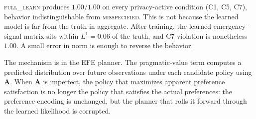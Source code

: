 \documentclass[10pt,twocolumn]{article}
\begin{document}
\begin{table}[H]
\centering
\scriptsize
{}
\caption{Learning configurations on C1--C7, $50$ trials each. \textsc{full\_learn} collapses to maximum violation on every privacy-active condition: na\"ive learning destroys the discrimination needed for emergency override. \textsc{hierarchical} recovers full mission success and half or more of the lost compliance; the residual gap to \textsc{oracle} traces to the sanction channel, which a compliant agent cannot learn from data (see text).}
\label{tab:learning}
\end{table}

\textsc{full\_learn} produces $1.00/1.00$ on every privacy-active condition (C1, C5, C7), behavior indistinguishable from \textsc{misspecified}. This is not because the learned model is far from the truth in aggregate. After training, the learned emergency-signal matrix sits within $L^1 = 0.06$ of the truth, and C7 violation is nonetheless $1.00$. A small error in norm is enough to reverse the behavior.

The mechanism is in the EFE planner. The pragmatic-value term computes a predicted distribution over future observations under each candidate policy using $\mathbf{A}$. When $\mathbf{A}$ is imperfect, the policy that maximizes apparent preference satisfaction is no longer the policy that satisfies the actual preferences: the preference encoding is unchanged, but the planner that rolls it forward through the learned likelihood is corrupted.
\end{document}
